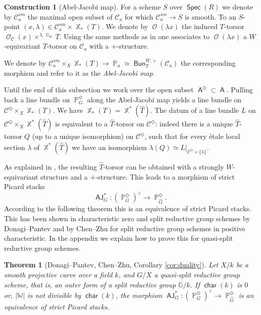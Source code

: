 \documentclass{article}
\DeclareMathOperator{\Bun}{\mathsf{Bun}}
\DeclareMathOperator{\A}{\mathsf{A}}
\newcommand{\Cc}{\mathcal{C}}
\newcommand{\Gb}{\mathbb{G}}
\DeclareMathOperator{\Pb}{\mathbb{P}}
\DeclareMathOperator{\Xb}{\mathbb{X}}
\DeclareMathOperator{\G}{\mathbb{G}}
\DeclareMathOperator{\Spec}{\mathsf{Spec}}
\DeclareMathOperator{\Oo}{\mathcal{O}}
\DeclareMathOperator{\charac}{\mathsf{char}}
\DeclareMathOperator{\AJ}{\mathsf{AJ}}
\theoremstyle{definition}
\newtheorem{construction}[definition]{Construction}
\theoremstyle{plain}
\newtheorem{theorem}[definition]{Theorem}
\begin{document}
\begin{construction}[Abel-Jacobi map]\label{const:AJ}
For a scheme $S$ over $\Spec(R)$ we denote by $\Cc_a^{sm}$ the maximal open subset of $\Cc_a$ for which $\Cc_a^{sm} \to S$ is smooth.
To an $S$-point $(x,\lambda) \in \Cc_a^{sm} \times \Xb_*(T)$. We denote by $\Oo(\lambda x)$ the induced $T$-torsor $\Oo_{\Cc}(x) \times^{\lambda,\G_m} T$. Using the same methods as in \cite[3.4]{chenzhu} one associates to $\Oo(\lambda x)$ a $W$-equivariant $T$-torsor on $\Cc_a$ with a $+$-structure.

We denote by $\Cc_a^{sm} \times_X \Xb_*({T}) \to \Pb_a \simeq \Bun_T^{W,+}(\Cc_a)$ the corresponding morphism and refer to it as the \emph{Abel-Jacobi map}.
\end{construction}

Until the end of this subsection we work over the open subset $\A^{\Diamond} \subset \A$. Pulling back a line bundle on $\Pb_G^\Diamond$ along the Abel-Jacobi map yields a line bundle on $\Cc^{\Diamond} \times_X \Xb_*(T)$. We have $\Xb_*(T) = \Xb^*(\widehat{T})$. The datum of a line bundle $L$ on $\Cc^{\Diamond} \times_X \Xb^*(\widehat{T})$ is equivalent to a $\widehat{T}$-torsor on $\Cc^{\Diamond}$: indeed there is a unique $\widehat{T}$-torsor $Q$ (up to a unique isomorphism) on $\Cc^{\Diamond}$, such that for every \'etale local section $\lambda$ of $\Xb^*(\widehat{T})$ we have an isomorphism $\lambda(Q) \simeq L|_{\Cc^{\Diamond} \times \{\lambda\}}$.

As explained in \cite[Section 3]{chenzhu}, the resulting $\widehat{T}$-torsor can be obtained with a strongly $W$-equivariant structure and a $+$-structure. This leads to a morphism of strict Picard stacks
$$\AJ_{G}^*\colon (\Pb_G^{\Diamond})^{\vee} \to \Pb_{\widehat{G}}^\Diamond.$$
According to the following theorem this is an equivalence of strict Picard stacks. This has been shown in characteristic zero and split reductive group schemes by Donagi--Pantev \cite{MR2957305} and by Chen--Zhu \cite[Section 3]{chenzhu} for split reductive group schemes in positive characteristic. In the appendix we explain how to prove this for quasi-split reductive group schemes.

\begin{theorem}[Donagi--Pantev, Chen--Zhu, Corollary \ref{cor:duality}]\label{thm:duality_quasi-split}
Let $X/k$ be a smooth projective curve over a field $k$, and $G/X$ a quasi-split reductive group scheme, that is, an outer form of a split reductive group $\Gb/k$. If $\charac(k)$ is $0$ or, $|\mathbb{W}|$ is not divisible by $\charac(k)$, the morphism
$\AJ_{G}^*\colon (\Pb_G^{\Diamond})^{\vee} \to \Pb_{\widehat{G}}^\Diamond$ is an equivalence of strict Picard stacks.
\end{theorem}
\end{document}

